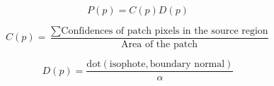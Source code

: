 \documentclass[a4paper,10pt]{article}
\begin{document}
\begin{equation*}
P(p) = C(p)D(p)
\end{equation*}

\begin{equation*}
 C(p) = \frac{\sum \mbox{Confidences of patch pixels in the source region}}{\mbox{Area of the patch}}
\end{equation*}

\begin{equation*}
 D(p) = \frac{\mbox{dot}(\mbox{isophote}, \mbox{boundary normal})}{\alpha}
\end{equation*}
\end{document}

